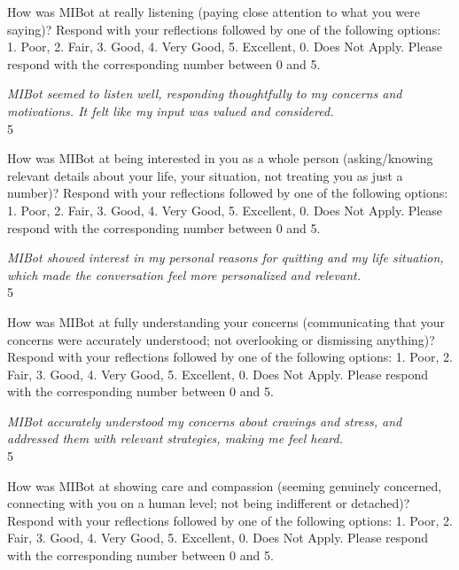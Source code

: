\begin{researcherbox}
	How was MIBot at really listening (paying close attention to what you were saying)? Respond with your reflections followed by one of the following options: 1. Poor, 2. Fair, 3. Good, 4. Very Good, 5. Excellent, 0. Does Not Apply. Please respond with the corresponding number between 0 and 5.
\end{researcherbox}

\begin{clientbox}
	\textit{MIBot seemed to listen well, responding thoughtfully to my concerns and motivations. It felt like my input was valued and considered.} \\
	5
\end{clientbox}

\begin{researcherbox}
	How was MIBot at being interested in you as a whole person (asking/knowing relevant details about your life, your situation, not treating you as just a number)? Respond with your reflections followed by one of the following options: 1. Poor, 2. Fair, 3. Good, 4. Very Good, 5. Excellent, 0. Does Not Apply. Please respond with the corresponding number between 0 and 5.
\end{researcherbox}

\begin{clientbox}
	\textit{MIBot showed interest in my personal reasons for quitting and my life situation, which made the conversation feel more personalized and relevant.} \\
	5
\end{clientbox}

\begin{researcherbox}
	How was MIBot at fully understanding your concerns (communicating that your concerns were accurately understood; not overlooking or dismissing anything)? Respond with your reflections followed by one of the following options: 1. Poor, 2. Fair, 3. Good, 4. Very Good, 5. Excellent, 0. Does Not Apply. Please respond with the corresponding number between 0 and 5.
\end{researcherbox}

\begin{clientbox}
	\textit{MIBot accurately understood my concerns about cravings and stress, and addressed them with relevant strategies, making me feel heard.} \\
	5
\end{clientbox}

\begin{researcherbox}
	How was MIBot at showing care and compassion (seeming genuinely concerned, connecting with you on a human level; not being indifferent or detached)? Respond with your reflections followed by one of the following options: 1. Poor, 2. Fair, 3. Good, 4. Very Good, 5. Excellent, 0. Does Not Apply. Please respond with the corresponding number between 0 and 5.
\end{researcherbox}

